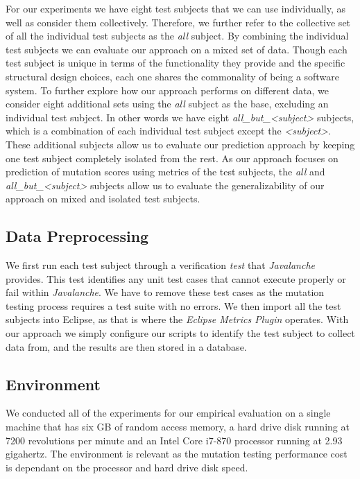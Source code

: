 For our experiments we have eight test subjects that we can use individually, as well as consider them collectively. Therefore, we further refer to the collective set of all the individual test subjects as the \emph{all} subject. By combining the individual test subjects we can evaluate our approach on a mixed set of data. Though each test subject is unique in terms of the functionality they provide and the specific structural design choices, each one shares the commonality of being a software system. To further explore how our approach performs on different data, we consider eight additional sets using the \emph{all} subject as the base, excluding an individual test subject. In other words we have eight \emph{all\_but\_<subject>} subjects, which is a combination of each individual test subject except the \emph{<subject>}. These additional subjects allow us to evaluate our prediction approach by keeping one test subject completely isolated from the rest. As our approach focuses on prediction of mutation scores using metrics of the test subjects, the \emph{all} and \emph{all\_but\_<subject>} subjects allow us to evaluate the generalizability of our approach on mixed and isolated test subjects.


\subsection{Data Preprocessing}
\label{subsec:experiment_data_preprocessing}
We first run each test subject through a verification \emph{test} that \emph{Javalanche} provides. This test identifies any unit test cases that cannot execute properly or fail within \emph{Javalanche}. We have to remove these test cases as the mutation testing process requires a test suite with no errors. We then import all the test subjects into Eclipse, as that is where the \emph{Eclipse Metrics Plugin} operates. With our approach we simply configure our scripts to identify the test subject to collect data from, and the results are then stored in a database.


\subsection{Environment}
\label{subsec:experiment_environment}
We conducted all of the experiments for our empirical evaluation on a single machine that has six GB of random access memory, a hard drive disk running at 7200 revolutions per minute  and an Intel Core i7-870 processor running at 2.93 gigahertz. The environment is relevant as the mutation testing performance cost is dependant on the processor and hard drive disk speed.


